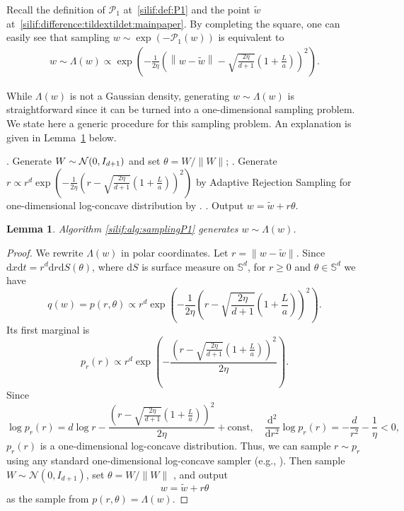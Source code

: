 \documentclass[11pt,letterpaper]{article}
\newcommand{\norm}[1]{\left\lVert #1 \right\rVert}
\newcommand{\brac}[1]{\left( #1\right)}
\newtheorem{lemma}[thm]{Lemma}
\begin{document}
Recall the definition of $\mathcal{P}_1$ at~\eqref{silif:def:P1} and the point $\tilde{w}$ at~\eqref{silif:difference:tildextildet:mainpaper}. By completing the square, one can easily see that sampling $w\sim \exp\brac{-\mathcal{P}_1(w)}$ is equivalent to
\begin{align*}
 w\sim \Lambda(w)\propto \exp\brac{-\frac{1}{2\eta}\brac{\norm{w-\tilde{w} }-\sqrt{\frac{2\eta}{d+1} }\brac{1+\frac{L}{a}} }^2}.
\end{align*}



While $\Lambda(w)$ is not a Gaussian density, generating $w\sim \Lambda(w)$ is straightforward since it can be turned into a one-dimensional sampling problem. We state here a generic procedure for this sampling problem. An explanation is given in Lemma~\ref{silif:lem:samplingP2} below. 
\begin{algorithm}[H]
	\caption{Sample $w \sim \Lambda(w)$} 
	\label{silif:alg:samplingP1}
	\begin{algorithmic}
		. Generate $W\sim {\cal N}(0,I_{d+1})$ and set $\theta = W/\|W\|$;
        . Generate $r \propto r^{d} \exp\left(-\frac{1}{2\eta} \brac{r-\sqrt{\frac{2\eta}{d+1} }\brac{1+\frac{L}{a}} }^2\right)$ by Adaptive Rejection Sampling for one-dimensional log-concave distribution by \cite{gilks1992adaptive}.
        . Output $w = \tilde{w} + r \theta$.
	\end{algorithmic}
\end{algorithm}

\begin{lemma}
\label{silif:lem:samplingP2}
    Algorithm \ref{silif:alg:samplingP1} generates $w \sim \Lambda(w)$.
\end{lemma}

\begin{proof}  
We rewrite $\Lambda(w)$ in polar coordinates.
Let $r = \| w - \widetilde{w} \|$. 
Since $\mathrm{d}x \mathrm{d}t = r^{d} \mathrm{d}r \mathrm{d}S(\theta)$,
where $\mathrm{d}S$ is surface measure on $\mathbb S^{d}$, for $r \ge 0$ and $\theta \in \mathbb{S}^{d}$ we have
\[
 q(w) = p(r,\theta) \propto r^{d} \exp \left(-\frac{1}{2\eta} \left(r - \sqrt{\frac{2\eta}{d+1}}  \left(1 + \frac{L}{a}\right)\right)^2\right).
\]
Its first marginal is 
\[
p_r(r) \propto r^{d} \exp \left(-\frac{\left(r - \sqrt{\frac{2\eta}{d+1}}  \left(1 + \frac{L}{a}\right)\right)^2} { 2\eta}\right).
\]
Since 
\[
\log p_r(r) = d \log r - \frac{\left(r - \sqrt{\frac{2\eta}{d+1}}  \left(1 + \frac{L}{a}\right)\right)^2 }{2\eta} + \text{const}, 
\quad 
\frac{\mathrm{d}^2}{\mathrm{d}r^2}\log p_r(r) = -\frac{d}{r^2} - \frac{1}{\eta} < 0,
\]
$p_r(r)$ is a one-dimensional log-concave distribution.
Thus, we can sample $r \sim p_r$ using any standard one-dimensional log-concave sampler (e.g., \cite{gilks1992adaptive}).
Then sample $W \sim \mathcal{N}(0, I_{d+1})$, set $\theta = W / \|W\|$ \cite{muller1959note}, and output 
\[
w = \tilde{w} + r \theta
\]
as the sample from $p(r,\theta) = \Lambda(w)$.
\end{proof}
\end{document}
